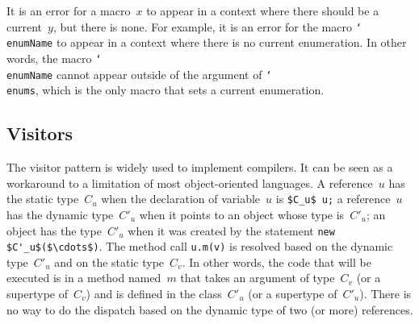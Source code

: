 \documentclass{llncs}
\newcommand{\jmlCode}{\lstinline[style=jml,basicstyle=\normalsize]}
\newcommand{\macro}[1]{\texttt{\char`\\#1}}
\begin{document}
It is an error for a macro~$x$ to appear in a context where
there should be a current~$y$, but there is none. For example,
it is an error for the macro \macro{enumName} to appear in a
context where there is no current enumeration. In other words,
the macro \macro{enumName} cannot appear outside of the argument
of \macro{enums}, which is the only macro that sets a current
enumeration.

\subsection{Visitors} %
\label{sec:visitors}

The visitor pattern is widely used to implement compilers. It can
be seen as a workaround to a limitation of most object-oriented
languages. A reference~$u$ has the static type~$C_u$ when the
declaration of variable~$u$ is \jmlCode|$C_u$ u;| a reference~$u$
has the dynamic type~$C'_u$ when it points to an object whose
type is~$C'_u$; an object has the type~$C'_u$ when it was created
by the statement \jmlCode|new $C'_u$($\cdots$)|. The method call
\jmlCode|u.m(v)| is resolved based on the dynamic type~$C'_u$
and on the static type~$C_v$. In other words, the code that will
be executed is in a method named~$m$ that takes an argument
of type~$C_v$ (or a supertype of~$C_v$) and is defined in the
class~$C'_u$ (or a supertype of~$C'_u$). There is no way to
do the dispatch based on the dynamic type of two (or more)
references.
\end{document}
